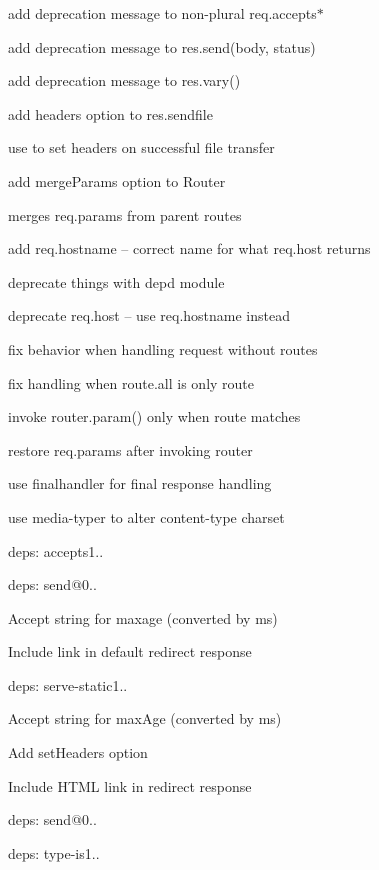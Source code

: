 {\ttfamily 
\begin{DoxyItemize}
\item add deprecation message to non-\/plural {\ttfamily req.\+accepts$\ast$}
\item add deprecation message to {\ttfamily res.\+send(body, status)}
\item add deprecation message to {\ttfamily res.\+vary()}
\item add {\ttfamily headers} option to {\ttfamily res.\+sendfile}
\begin{DoxyItemize}
\item use to set headers on successful file transfer
\end{DoxyItemize}
\item add {\ttfamily merge\+Params} option to {\ttfamily Router}
\begin{DoxyItemize}
\item merges {\ttfamily req.\+params} from parent routes
\end{DoxyItemize}
\item add {\ttfamily req.\+hostname} -- correct name for what {\ttfamily req.\+host} returns
\item deprecate things with {\ttfamily depd} module
\item deprecate {\ttfamily req.\+host} -- use {\ttfamily req.\+hostname} instead
\item fix behavior when handling request without routes
\item fix handling when {\ttfamily route.\+all} is only route
\item invoke {\ttfamily router.\+param()} only when route matches
\item restore {\ttfamily req.\+params} after invoking router
\item use {\ttfamily finalhandler} for final response handling
\item use {\ttfamily media-\/typer} to alter content-\/type charset
\item deps\+: accepts1..
\item deps\+: send@0..
\begin{DoxyItemize}
\item Accept string for {\ttfamily maxage} (converted by {\ttfamily ms})
\item Include link in default redirect response
\end{DoxyItemize}
\item deps\+: serve-\/static1..
\begin{DoxyItemize}
\item Accept string for {\ttfamily max\+Age} (converted by {\ttfamily ms})
\item Add {\ttfamily set\+Headers} option
\item Include H\+T\+ML link in redirect response
\item deps\+: send@0..
\end{DoxyItemize}
\item deps\+: type-\/is1..
\end{DoxyItemize}}

